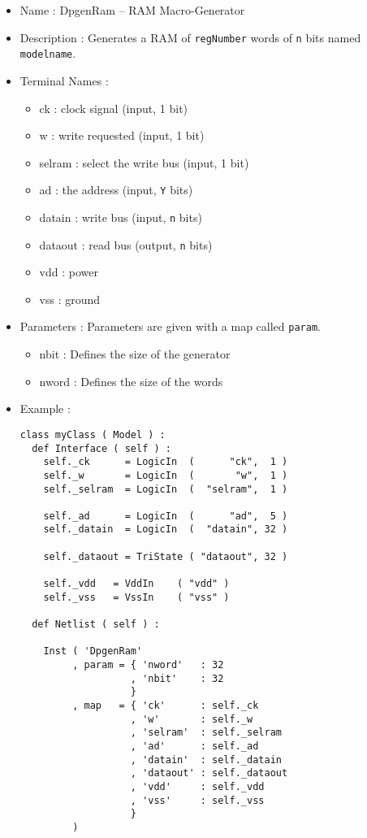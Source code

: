\begin{itemize}
    \item Name : DpgenRam -- RAM Macro-Generator
    \item Description : Generates a RAM  of \verb-regNumber- words of \verb-n- bits named \verb-modelname-.
    \item Terminal Names :
    \begin{itemize}
        \item ck : clock signal (input, 1 bit)
        \item w : write requested (input, 1 bit)
        \item selram : select the write bus (input, 1 bit)
        \item ad : the address (input, \verb-Y- bits)
        \item datain : write bus (input, \verb-n- bits)
        \item dataout : read bus (output, \verb-n- bits)
        \item vdd : power
        \item vss : ground
    \end{itemize}
    \item Parameters : Parameters are given with a map called \verb-param-.
    \begin{itemize}
        \item nbit : Defines the size of the generator
        \item nword : Defines the size of the words
    \end{itemize}
    \item Example :
\begin{verbatim}
class myClass ( Model ) :
  def Interface ( self ) :
    self._ck      = LogicIn  (      "ck",  1 )
    self._w       = LogicIn  (       "w",  1 )
    self._selram  = LogicIn  (  "selram",  1 )

    self._ad      = LogicIn  (      "ad",  5 )
    self._datain  = LogicIn  (  "datain", 32 )
    
    self._dataout = TriState ( "dataout", 32 )
    
    self._vdd   = VddIn    ( "vdd" )
    self._vss   = VssIn    ( "vss" )
    
  def Netlist ( self ) :
      
    Inst ( 'DpgenRam'
         , param = { 'nword'   : 32
                   , 'nbit'    : 32
                   }
         , map   = { 'ck'      : self._ck
                   , 'w'       : self._w
                   , 'selram'  : self._selram
                   , 'ad'      : self._ad
                   , 'datain'  : self._datain
                   , 'dataout' : self._dataout
                   , 'vdd'     : self._vdd
                   , 'vss'     : self._vss
                   }
         ) 
\end{verbatim}
\end{itemize}
